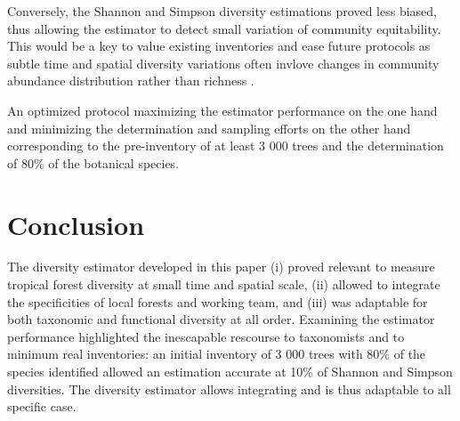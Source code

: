 \documentclass[fleqn,10pt]{ArtEcoFoG} %
\begin{document}
Conversely, the Shannon and Simpson diversity estimations proved less
biased, thus allowing the estimator to detect small variation of
community equitability. This would be a key to value existing
inventories and ease future protocols as subtle time and spatial
diversity variations often invlove changes in community abundance
distribution rather than richness
\citep{Baraloto2012a, Berry2008a, Cannon1998, Plumptre1996}.

An optimized protocol maximizing the estimator performance on the one
hand and minimizing the determination and sampling efforts on the other
hand corresponding to the pre-inventory of at least 3 000 trees and the
determination of 80\% of the botanical species.

\section{Conclusion}\label{conclusion}

The diversity estimator developed in this paper (i) proved relevant to
measure tropical forest diversity at small time and spatial scale, (ii)
allowed to integrate the specificities of local forests and working
team, and (iii) was adaptable for both taxonomic and functional
diversity at all order. Examining the estimator performance highlighted
the inescapable rescourse to taxonomists and to minimum real
inventories: an initial inventory of 3 000 trees with 80\% of the
species identified allowed an estimation accurate at 10\% of Shannon and
Simpson diversities. The diversity estimator allows integrating and is
thus adaptable to all specific case.



\makeatletter

\makeatother


\end{document}

